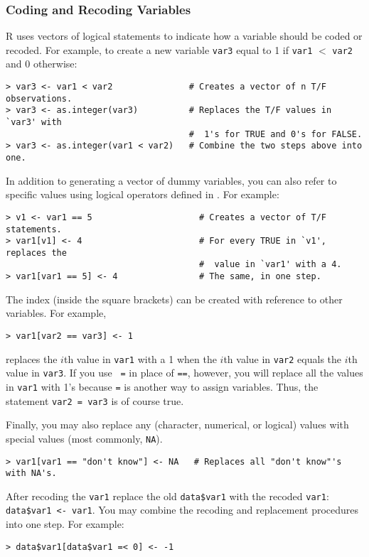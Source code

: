 \documentclass{article}
\begin{document}
\subsubsection*{Coding and Recoding Variables}

R uses vectors of logical statements to indicate how a variable should
be coded or recoded.  For example, to create a new variable {\tt var3}
equal to 1 if {\tt var1} $<$ {\tt var2} and 0 otherwise:
\begin{verbatim}
> var3 <- var1 < var2               # Creates a vector of n T/F observations.
> var3 <- as.integer(var3)          # Replaces the T/F values in `var3' with 
                                    #  1's for TRUE and 0's for FALSE.  
> var3 <- as.integer(var1 < var2)   # Combine the two steps above into one.
\end{verbatim}

In addition to generating a vector of dummy variables, you can also
refer to specific values using logical operators defined in
.  For example:
\begin{verbatim}
> v1 <- var1 == 5                     # Creates a vector of T/F statements.
> var1[v1] <- 4                       # For every TRUE in `v1', replaces the 
                                      #  value in `var1' with a 4.  
> var1[var1 == 5] <- 4                # The same, in one step.  
\end{verbatim}
The index (inside the square brackets) can be created with reference
to other variables.  For example,
\begin{verbatim}
> var1[var2 == var3] <- 1  
\end{verbatim}
replaces the $i$th value in {\tt var1} with a 1 when the $i$th value
in {\tt var2} equals the $i$th value in {\tt var3}.  If you use {\tt
  =} in place of {\tt ==}, however, you will replace all the values in
{\tt var1} with 1's because {\tt =} is another way to assign
variables.  Thus, the statement {\tt var2 = var3} is of course true.

Finally, you may also replace any (character, numerical, or logical)
values with special values (most commonly, {\tt NA}).
\begin{verbatim}
> var1[var1 == "don't know"] <- NA   # Replaces all "don't know"'s with NA's.
\end{verbatim}

After recoding the {\tt var1} replace the old {\tt data\$var1} with
the recoded {\tt var1}: {\tt data\$var1 <- var1}.  You may combine the
recoding and replacement procedures into one step.  For example:
\begin{verbatim}
> data$var1[data$var1 =< 0] <- -1
\end{verbatim}
\end{document}
